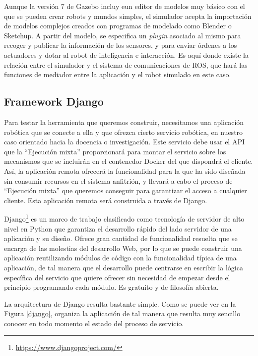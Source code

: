 Aunque la versión 7 de Gazebo incluy eun editor de modelos muy básico con el que se pueden crear robots y mundos simples, el simulador acepta la importación de modelos complejos creados con programas de modelado como Blender o Sketchup. A partir del modelo, se especifica un \textit{plugin} asociado al mismo para recoger y publicar la información de los sensores, y para enviar órdenes a los actuadores y dotar al robot de inteligencia e interacción. Es aquí donde existe la relación entre el simulador y el sistema de comunicaciones de ROS, que hará las funciones de mediador entre la aplicación y el robot simulado en este caso.

\subsection{Framework Django}

Para testar la herramienta que queremos construir, necesitamos una aplicación robótica que se conecte a ella y que ofrezca cierto servicio robótica, en nuestro caso orientado hacia la docencia o investigación. Este servicio debe usar el API que la ``Ejecución mixta'' proporcionará para montar el servicio sobre los mecanismos que se incluirán en el contenedor Docker del que dispondrá el cliente. Así, la aplicación remota ofrecerá la funcionalidad para la que ha sido diseñada sin consumir recursos en el sistema anfitrión, y llevará a cabo el proceso de ``Ejecución mixta'' que queremos conseguir para garantizar el acceso a cualquier cliente. Esta aplicación remota será construida a través de Django.

Django\footnote{\url{https://www.djangoproject.com/}} es un marco de trabajo clasificado como tecnología de servidor de alto nivel en Python que garantiza el desarrollo rápido del lado servidor de una aplicación y su diseño. Ofrece gran cantidad de funcionalidad resuelta que se encarga de las molestias del desarrollo Web, por lo que se puede construir una aplicación reutilizando módulos de código con la funcionalidad típica de una aplicación, de tal manera que el desarrollo puede centrarse en escribir la lógica específica del servicio que quiere ofrecer sin necesidad de empezar desde el principio programando cada módulo. Es gratuito y de filosofía abierta.

La arquitectura de Django resulta bastante simple. Como se puede ver en la Figura \ref{django}, organiza la aplicación de tal manera que resulta muy sencillo conocer en todo momento el estado del proceso de servicio.

